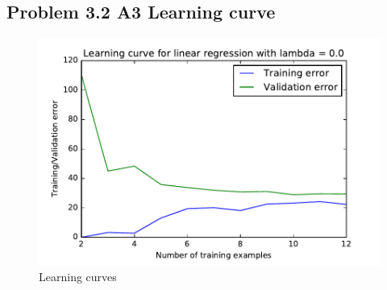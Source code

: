 \documentclass[pdftex,11pt]{article}
\begin{document}
\subsection{Problem 3.2 A3 Learning curve}

\begin{figure}
  \caption{Learning curves}
  \centering
    \includegraphics[scale=1]{fig8.pdf}
\end{figure}
\end{document}
